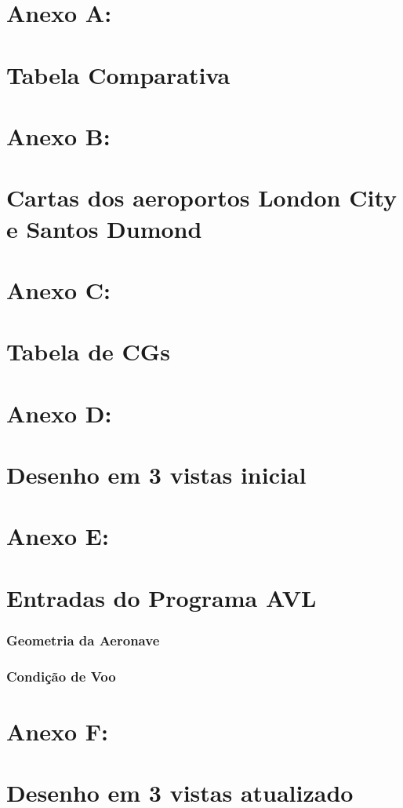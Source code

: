 \part*{Anexo A:\\~\\ Tabela Comparativa}
\label{anexoA}
  

\part*{Anexo B:\\~\\ Cartas dos aeroportos London City e Santos Dumond}
\label{anexoB}
  
  
  

\part*{Anexo C:\\~\\ Tabela de CGs}
\label{anexoC}
  

\part*{Anexo D:\\~\\ Desenho em 3 vistas inicial}
\label{anexoD}
  


\part*{Anexo E:\\~\\ Entradas do Programa AVL}
\label{anexoE}
\section*{Geometria da Aeronave}


\section*{Condição de Voo}


\part*{Anexo F:\\~\\ Desenho em 3 vistas atualizado}
\label{anexoF}
  
